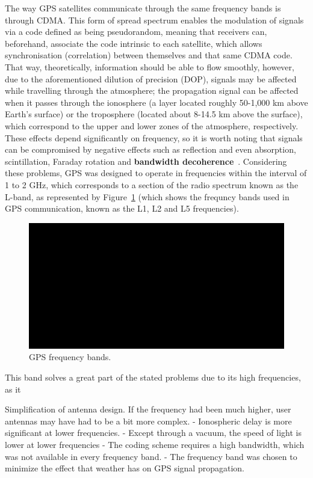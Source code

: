 The way GPS satellites communicate through the same frequency bands is through CDMA. This form of spread spectrum enables the modulation of signals via a code defined as being pseudorandom, meaning that receivers can, beforehand, associate the code intrinsic to each satellite, which allows synchronisation (correlation) between themselves and that same CDMA code. That way, theoretically, information should be able to flow smoothly, however, due to the aforementioned dilution of precision (DOP), signals may be affected while travelling through the atmosphere;
the propagation signal can be affected when it passes through the ionosphere (a layer located roughly 50-1,000 km above Earth's surface) or the troposphere (located about 8-14.5 km above the surface), which correspond to the upper and lower zones of the atmosphere, respectively. These effects depend significantly on frequency, so it is worth noting that signals can be compromised by negative effects such as reflection and even absorption, scintillation, Faraday rotation and \textbf{bandwidth decoherence}~\cite{au_gov_satell}. Considering these problems, GPS was designed to operate in frequencies within the interval of 1 to 2 GHz, which corresponds to a section of the radio spectrum known as the L-band, as represented by Figure~\ref{fig:gps_bands} (which shows the frequncy bands used in GPS communication, known as the L1, L2 and L5 frequencies).
\begin{figure}[ht]
	\centering
	\includegraphics[width=1.0\textwidth]{Chapters/Figures/demo.png}
	\caption{GPS frequency bands.}
	\label{fig:gps_bands}
\end{figure}

This band solves a great part of the stated problems due to its high frequencies, as it 

Simplification of antenna design. If the frequency had been much higher, user antennas may have had to be a bit more complex.
- Ionospheric delay is more significant at lower frequencies.
- Except through a vacuum, the speed of light is lower at lower frequencies
- The coding scheme requires a high bandwidth, which was not available in every frequency band.
- The frequency band was chosen to minimize the effect that weather has on GPS signal propagation.

